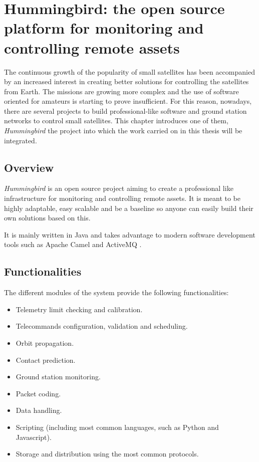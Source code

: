 
\chapter{Hummingbird: the open source platform for monitoring and controlling remote assets}\label{chapter3}

The continuous growth of the popularity of small satellites has been accompanied by an increased interest in creating better solutions for controlling the satellites from Earth. The missions are growing more complex and the use of software oriented for amateurs is starting to prove insufficient. For this reason, nowadays, there are  several projects to build professional-like software and ground station networks to control small satellites. This chapter introduces one of them, \emph{Hummingbird} \citep{HBird} the project into which the work carried on in this thesis will be integrated. 

\section{Overview} 

\emph{Hummingbird} is an open source project aiming to create a professional like infrastructure for monitoring and controlling remote assets. It is meant to be highly adaptable, easy scalable and be a baseline so anyone can easily build their own solutions based on this. 

It is mainly written in Java \cite{Java} and takes advantage to modern software development tools such as Apache Camel \cite{Camel} and ActiveMQ \cite{AMQ}. 
\pagebreak
\section{Functionalities}

The different modules of the system provide the following functionalities: \cite{Elo}

\begin{itemize}
\item Telemetry limit checking and calibration.
\item Telecommands configuration, validation and scheduling.
\item Orbit propagation.
\item Contact prediction.
\item Ground station monitoring.
\item Packet coding.
\item Data handling.
\item Scripting (including most common languages, such as Python and Javascript).
\item Storage and distribution using the most common protocols.

\end{itemize}



